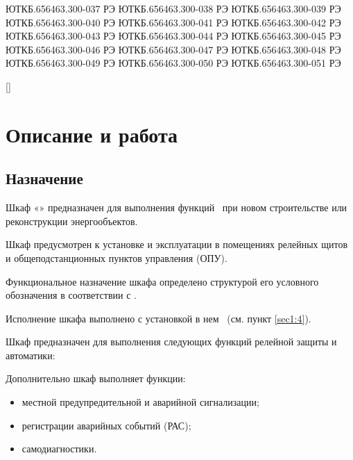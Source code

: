 {{	{ЮТКБ.656463.300-037 РЭ}{\ManualThirtySeven}%
	{ЮТКБ.656463.300-038 РЭ}{\ManualThirtyEight}%
	{ЮТКБ.656463.300-039 РЭ}{\ManualThirtyNine}	%
	{ЮТКБ.656463.300-040 РЭ}{\ManualFourty}		%
	{ЮТКБ.656463.300-041 РЭ}{\ManualFourtyOne}	%
	{ЮТКБ.656463.300-042 РЭ}{\ManualFourtyTwo}	%
	{ЮТКБ.656463.300-043 РЭ}{\ManualFourtyThree}%
	{ЮТКБ.656463.300-044 РЭ}{\ManualFourtyFour}	%
	{ЮТКБ.656463.300-045 РЭ}{\ManualFourtyFive}	%
	{ЮТКБ.656463.300-046 РЭ}{\ManualFourtySix}	%
	{ЮТКБ.656463.300-047 РЭ}{\ManualFourtySeven}%
	{ЮТКБ.656463.300-048 РЭ}{\ManualFourtyEight}%
	{ЮТКБ.656463.300-049 РЭ}{\ManualFourtyNine}	%
	{ЮТКБ.656463.300-050 РЭ}{\ManualFifty}		%
	{ЮТКБ.656463.300-051 РЭ}{\ManualFiftyOne}	%
	
  }[]%
}

\setDeviceVariables


{\color{unimain}\section[Описание и работа]{Описание и работа}}

{\color{unimain}\subsection{Назначение}}

\begin{enumsub}
\item Шкаф «\devicetype» предназначен для выполнения функций \funcCabinet~при новом строительстве или реконструкции энергообъектов.
\item Шкаф предусмотрен к установке и эксплуатации в помещениях релейных щитов и общеподстанционных пунктов управления (ОПУ).
\item Функциональное назначение шкафа определено структурой его условного обозначения в соответствии с \STO.
\item Исполнение шкафа выполнено с установкой в нем \units~(см. пункт \ref{sec1:4}).
\item Шкаф предназначен для выполнения следующих функций релейной защиты и автоматики:
  \begin{itemize}
	\functions
  \end{itemize}
\item Дополнительно шкаф выполняет функции:
  \begin{itemize}
  \item местной предупредительной и аварийной сигнализации;
  \item регистрации аварийных событий (РАС);
  \item самодиагностики.
  \end{itemize}
\end{enumsub}

